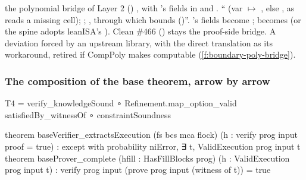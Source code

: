 \begin{change}{the polynomial bridge of Layer 2 ()}
\asis {}, with 's
fields in  and .
\asproposed \enquote{
(var  $↦$ , else , as  reads a missing cell);
;
,
through which  bounds  ()}.
's fields become ;  becomes  (or the
spine adopts leanISA's ). Clean \#466 () stays the
proof-side bridge.
\reason A deviation forced by an upstream library, with the direct translation as its workaround,
retired if CompPoly makes  computable (\cref{f:boundary-poly-bridge}).
\end{change}

\subsubsection{The composition of the base theorem, arrow by arrow}\label{sec:gen-boundary-st-composition}

\begin{leancode}
   T4  =  verify_knowledgeSound  ∘  Refinement.map_option_valid satisfiedBy_witnessOf  ∘  constraintSoundness
\end{leancode}
\begin{leancode}
theorem baseVerifier_extractsExecution (fs bcs mca flock) (h : verify prog input proof = true) :
    except with probability niError, ∃ t, ValidExecution prog input t
theorem baseProver_complete (hfill : HasFillBlocks prog) (h : ValidExecution prog input t) :
    verify prog input (prove prog input (witness of t)) = true
\end{leancode}

